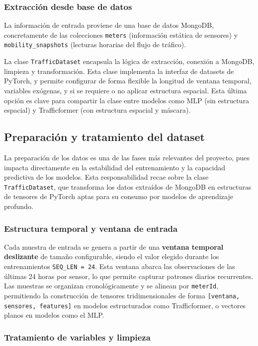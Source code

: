 \subsubsection*{Extracción desde base de datos}

La información de entrada proviene de una base de datos MongoDB, concretamente de las colecciones \texttt{meters} (información estática de sensores) y \texttt{mobility\_snapshots} (lecturas horarias del flujo de tráfico).

La clase \texttt{TrafficDataset} encapsula la lógica de extracción, conexión a MongoDB, limpieza y transformación. Esta clase implementa la interfaz de datasets de PyTorch, y permite configurar de forma flexible la longitud de ventana temporal, variables exógenas, y si se requiere o no aplicar estructura espacial. Esta última opción es clave para compartir la clase entre modelos como MLP (sin estructura espacial) y Trafficformer (con estructura espacial y máscara).

\subsection{Preparación y tratamiento del dataset}

La preparación de los datos es una de las fases más relevantes del proyecto, pues impacta directamente en la estabilidad del entrenamiento y la capacidad predictiva de los modelos. Esta responsabilidad recae sobre la clase \texttt{TrafficDataset}, que transforma los datos extraídos de MongoDB en estructuras de tensores de PyTorch aptas para su consumo por modelos de aprendizaje profundo.

\subsubsection*{Estructura temporal y ventana de entrada}

Cada muestra de entrada se genera a partir de una \textbf{ventana temporal deslizante} de tamaño configurable, siendo el valor elegido durante los entrenamientos \texttt{SEQ\_LEN = 24}. Esta ventana abarca las observaciones de las últimas 24 horas por sensor, lo que permite capturar patrones diarios recurrentes. Las muestras se organizan cronológicamente y se alinean por \texttt{meterId}, permitiendo la construcción de tensores tridimensionales de forma \texttt{[ventana, sensores, features]} en modelos estructurados como Trafficformer, o vectores planos en modelos como el MLP.

\subsubsection*{Tratamiento de variables y limpieza}

